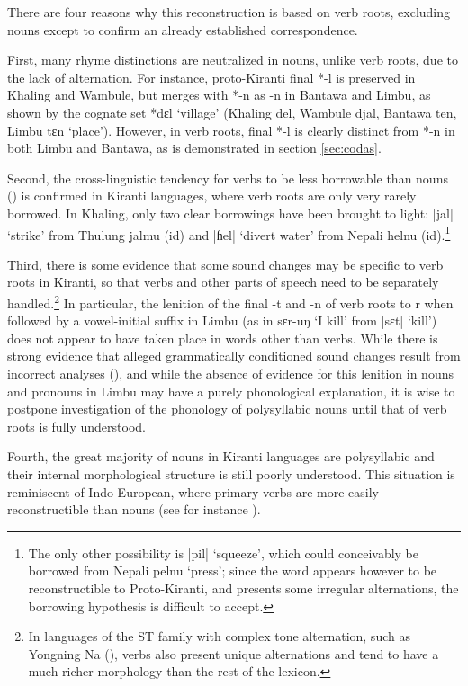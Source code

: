 \documentclass[oneside,a4paper,11pt]{article}
\newcommand{\ipa}[1]{{\phon\mbox{#1}}} %
\newcommand{\dhatu}[2]{|\ipa{#1}| `#2'}
\begin{document}
There are four reasons why this reconstruction is based on verb roots, excluding nouns except to confirm an already established correspondence.

First,  many rhyme distinctions are neutralized in nouns, unlike verb roots, due to the lack of alternation. For instance, proto-Kiranti final *\ipa{-l} is preserved in Khaling and Wambule, but merges with *\ipa{-n} as \ipa{-n} in Bantawa and Limbu, as shown by the cognate set *\ipa{dɛl} `village' (Khaling \ipa{del}, Wambule \ipa{djal}, Bantawa \ipa{ten}, Limbu \ipa{tɛn} `place'). However, in verb roots, final *\ipa{-l} is clearly distinct from *\ipa{-n} in both Limbu and Bantawa, as is demonstrated in section \ref{sec:codas}.

Second, the cross-linguistic tendency for verbs to be less borrowable than nouns (\citealt{wohlgemuth09verbal}) is confirmed in Kiranti languages, where verb roots are only very rarely borrowed. In Khaling, only two clear borrowings have been brought to light: \dhatu{jal}{strike} from Thulung \ipa{jalmu}  (id) and \dhatu{ɦel}{divert water} from Nepali \ipa{helnu} (id).\footnote{The only other possibility is  \dhatu{pil}{squeeze}, which could conceivably be borrowed from Nepali \ipa{pelnu} `press'; since the word appears however to be reconstructible to Proto-Kiranti, and presents some irregular alternations, the borrowing hypothesis is difficult to accept.} 

Third, there is some evidence that some sound changes may be specific to verb roots in Kiranti, so that verbs and other parts of speech need to be separately handled.\footnote{In languages of the ST family with complex tone alternation, such as Yongning Na (\citealt{michaud08na, michaud17yongning}), verbs also present unique alternations and tend to have a much richer morphology than the rest of the lexicon.} In particular, the lenition of the final \ipa{-t} and \ipa{-n} of verb roots to \ipa{r} when followed by a vowel-initial suffix in Limbu (as in \ipa{sɛr-uŋ}  `I kill' from \dhatu{sɛt}{kill}) does not appear to have taken place in words other than verbs. While there is strong evidence that alleged grammatically conditioned sound changes result from incorrect analyses (\citealt{hill14conditioned}), and while the absence of evidence for this lenition in nouns and pronouns in Limbu may have a purely phonological explanation, it is wise to postpone investigation of the phonology of polysyllabic nouns until that of verb roots is fully understood.

Fourth, the great majority of nouns in Kiranti languages are polysyllabic and their internal morphological structure is still poorly understood. This situation is reminiscent of Indo-European, where primary verbs are more easily reconstructible than nouns (see for instance \citealt{garnier10vocalisme}).
\end{document}
